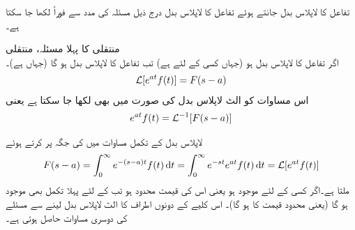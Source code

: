 تفاعل   کا لاپلاس بدل جانتے ہوئے تفاعل  کا لاپلاس بدل درج ذیل مسئلہ کی مدد سے فوراً لکھا جا سکتا ہے۔

\quad منتقلی کا پہلا مسئلہ،  منتقلی\\
اگر تفاعل  کا لاپلاس بدل  ہو (جہاں کسی  کے لئے  ہے) تب تفاعل  کا لاپلاس بدل  ہو گا (جہاں  ہے)۔
\begin{align*}
\mathcal{L}[e^{at}f(t)]=F(s-a)
\end{align*}
اس مساوات کو الٹ لاپلاس بدل کی صورت میں بھی لکھا جا سکتا ہے یعنی
\begin{align*}
e^{at}f(t)=\mathcal{L}^{-1}[F(s-a)]
\end{align*}

لاپلاس بدل کے تکمل مساوات  میں  کی جگہ  پر کرتے ہوئے 
\begin{align}\label{}
F(s-a)=\int_{0}^{\infty} e^{-(s-a)t} f(t)\dif t=\int_{0}^{\infty}e^{-st}{e^{at}f(t)}\dif t=\Laplace[e^{at}f(t)]
\end{align}
ملتا ہے۔اگر کسی  کے لئے  موجود ہو یعنی اس کی قیمت محدود ہو تب  کے لئے پہلا تکمل بھی موجود ہو گا (یعنی محدود قیمت کا ہو گا)۔ اس کلیے کے دونوں اطراف کا الٹ لاپلاس بدل لینے سے مسئلے کی دوسری مساوات حاصل ہوتی ہے۔

